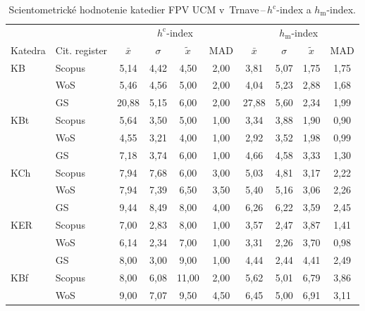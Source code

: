 \begin{table}
  \centering\small
  \caption[Hodnotenie FPV\,--\,$h^{\mathrm{c}}$-index a $h_{\mathrm{m}}$-index]%
  {Scientometrické hodnotenie katedier FPV UCM v~Trnave\,--\,$h^{\mathrm{c}}$-index a $h_{\mathrm{m}}$-index.}
  \label{tab:6-staff.results}
  \begin{tabularx}{\textwidth}{XXcccc@{\hspace{3ex}}cccc}
    \toprule\noalign{\vspace{.3ex}}
    & & \multicolumn{4}{c}{$h^{\mathrm{c}}$-index} & \multicolumn{4}{c}{$h_{\mathrm{m}}$-index} \\
    \cmidrule{3-6}\cmidrule{7-10}
    Katedra & Cit. register& $\bar{x}$ & $\sigma$ & $\tilde{x}$ & MAD  & $\bar{x}$ & $\sigma$ & $\tilde{x}$ & MAD \\[0.3ex]
    \midrule\noalign{\vspace{.5ex}}
    KB   & Scopus & 5,14  & 4,42 & 4,50  & 2,00 & 3,81  & 5,07 & 1,75 & 1,75 \\
         & WoS    & 5,46  & 4,56 & 5,00  & 2,00 & 4,04  & 5,23 & 2,88 & 1,68 \\
         & GS     & 20,88 & 5,15 & 6,00  & 2,00 & 27,88 & 5,60 & 2,34 & 1,99 \\[3ex]
    KBt  & Scopus & 5,64  & 3,50 & 5,00  & 1,00 & 3,34  & 3,88 & 1,90 & 0,90 \\
         & WoS    & 4,55  & 3,21 & 4,00  & 1,00 & 2,92  & 3,52 & 1,98 & 0,99 \\
         & GS     & 7,18  & 3,74 & 6,00  & 1,00 & 4,66  & 4,58 & 3,33 & 1,30 \\[3ex]
    KCh  & Scopus & 7,94  & 7,68 & 6,00  & 3,00 & 5,03  & 4,81 & 3,17 & 2,22 \\
         & WoS    & 7,94  & 7,39 & 6,50  & 3,50 & 5,40  & 5,16 & 3,06 & 2,26 \\
         & GS     & 9,44  & 8,49 & 8,00  & 4,00 & 6,26  & 6,22 & 3,59 & 2,45 \\[3ex]
    KER  & Scopus & 7,00  & 2,83 & 8,00  & 1,00 & 3,57  & 2,47 & 3,87 & 1,41 \\
         & WoS    & 6,14  & 2,34 & 7,00  & 1,00 & 3,31  & 2,26 & 3,70 & 0,98 \\
         & GS     & 8,00  & 3,00 & 9,00  & 1,00 & 4,44  & 2,44 & 4,41 & 2,49 \\[3ex]
    KBf  & Scopus & 8,00  & 6,08 & 11,00 & 2,00 & 5,62  & 5,01 & 6,79 & 3,86 \\
         & WoS    & 9,00  & 7,07 & 9,50  & 4,50 & 6,45  & 5,00 & 6,91 & 3,11 \\

\end{tabularx}
\end{table}
